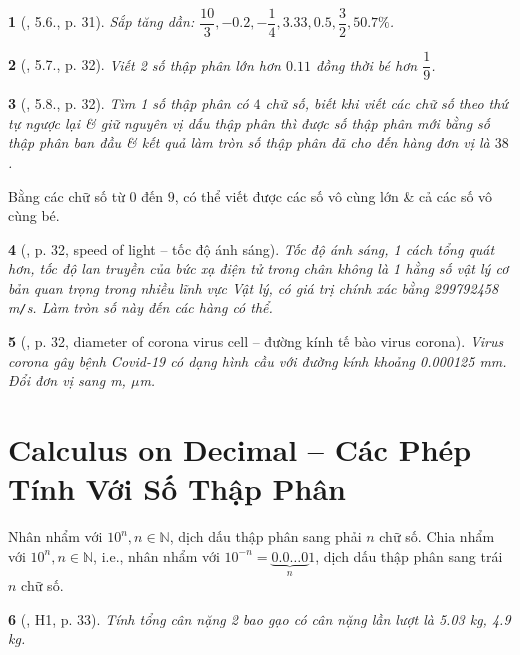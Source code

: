 \documentclass{article}
\newtheorem{baitoan}{}
\begin{document}
\begin{baitoan}[\cite{Binh_boi_duong_Toan_6_tap_2}, 5.6., p. 31]
	Sắp tăng dần: $\dfrac{10}{3},-0.2,-\dfrac{1}{4},3.33,0.5,\dfrac{3}{2},50.7\%$.
\end{baitoan}

\begin{baitoan}[\cite{Binh_boi_duong_Toan_6_tap_2}, 5.7., p. 32]
	Viết 2 số thập phân lớn hơn $0.11$ đồng thời bé hơn $\dfrac{1}{9}$.
\end{baitoan}

\begin{baitoan}[\cite{Binh_boi_duong_Toan_6_tap_2}, 5.8., p. 32]
	Tìm 1 số thập phân có $4$ chữ số, biết khi viết các chữ số theo thứ tự ngược lại \& giữ nguyên vị dấu thập phân thì được số thập phân mới bằng số thập phân ban đầu \& kết quả làm tròn số thập phân đã cho đến hàng đơn vị là $38$.
\end{baitoan}
Bằng các chữ số từ $0$ đến $9$, có thể viết được các số vô cùng lớn \& cả các số vô cùng bé.

\begin{baitoan}[\cite{Binh_boi_duong_Toan_6_tap_2}, p. 32, speed of light -- tốc độ ánh sáng]
	Tốc độ ánh sáng, 1 cách tổng quát hơn, tốc độ lan truyền của bức xạ điện tử trong chân không là 1 hằng số vật lý cơ bản quan trọng trong nhiều lĩnh vực Vật lý, có giá trị chính xác bằng {\rm299792458 m{\tt/}s}. Làm tròn số này đến các hàng có thể.
\end{baitoan}

\begin{baitoan}[\cite{Binh_boi_duong_Toan_6_tap_2}, p. 32, diameter of corona virus cell -- đường kính tế bào virus corona]
	Virus corona gây bệnh Covid-19 có dạng hình cầu với đường kính khoảng {\rm0.000125 mm}. Đổi đơn vị sang m, $\mu$m.
\end{baitoan}


\section{Calculus on Decimal -- Các Phép Tính Với Số Thập Phân}
 Nhân nhẩm với $10^n,n\in\mathbb{N}$, dịch dấu thập phân sang phải $n$ chữ số.  Chia nhẩm với $10^n,n\in\mathbb{N}$, i.e., nhân nhẩm với $10^{-n} = \underbrace{0.0\ldots0}_n1$, dịch dấu thập phân sang trái $n$ chữ số.

\begin{baitoan}[\cite{Binh_boi_duong_Toan_6_tap_2}, H1, p. 33]
	Tính tổng cân nặng 2 bao gạo có cân nặng lần lượt là {\rm5.03 kg, 4.9 kg}.
\end{baitoan}
\end{document}
